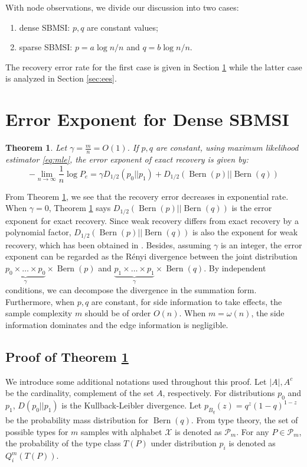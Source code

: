 \documentclass[conference,letterpaper]{IEEEtran}
\newtheorem{theorem}{Theorem}
\DeclareMathOperator{\Bern}{Bern}
\begin{document}
With node observations, we divide our discussion into two cases:
\begin{enumerate}
	\item dense SBMSI: $p,q$ are constant values;
\item sparse SBMSI: $p = a \log n /n$ and $q = b \log n / n$.
\end{enumerate}
The recovery error rate for the first case is given in Section \ref{sec:ee} while
the latter case is analyzed in Section \ref{sec:ees}.
\section{Error Exponent for Dense SBMSI}\label{sec:ee}
\begin{theorem}\label{thm:constant}
	Let $\gamma = \frac{m}{n} = O(1)$. If $p,q$ are constant, using maximum likelihood estimator \eqref{eq:mle},
	the error exponent of exact recovery is given by:
	\begin{equation}
	-\lim_{n\to \infty} \frac{1}{n}\log P_e =  \gamma D_{1/2}(p_0 || p_1) + D_{1/2}(\Bern(p)||\Bern(q))
	\end{equation} 
\end{theorem}
From Theorem \ref{thm:constant}, we see that the recovery error decreases in exponential rate.
When $\gamma=0$, Theorem \ref{thm:constant} says $D_{1/2}(\Bern(p)||\Bern(q))$
is the error exponent for exact recovery. Since weak recovery differs from exact recovery by a polynomial factor, $D_{1/2}(\Bern(p)||\Bern(q))$ is also the exponent for weak recovery, which has been obtained
in \cite{zhang2016}.
Besides, assuming $\gamma$ is an integer, the error exponent can be regarded as the Rényi divergence between the joint distribution
$\underbrace{p_0\times \dots \times p_0}_{\gamma} \times \Bern(p)$ and $\underbrace{p_1\times \dots \times p_1}_{\gamma} \times \Bern(q)$. By independent conditions, we can decompose the
divergence in the summation form.
Furthermore, when $p,q$ are constant, for side information to take effects, the sample complexity $m$ should be of order $O(n)$. When $m=\omega(n)$, the side information dominates and the edge information is negligible.

\subsection{Proof of Theorem \ref{thm:constant}}
We introduce some additional notations used throughout this proof. Let 
$|A|, A^c$ be the cardinality, complement of the set $A$, respectively. For distributions $p_0$ and $p_1$,
$D(p_0 || p_1)$ is the Kullback-Leibler divergence.
 Let
$p_{B_q}(z) = q^z(1-q)^{1-z}$ be the probability mass distribution for $\Bern(q)$.
From type theory, the set of possible types
for $m$ samples with alphabet $\mathcal{X}$ is denoted as $\mathcal{P}_m$. For any $P\in \mathcal{P}_m$, the probability of the type
class $T(P)$ under distribution $p_i$ is denoted as $Q_i^{m}(T(P))$.
\end{document}
